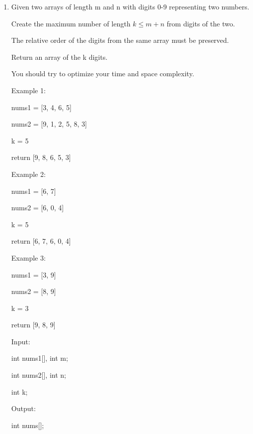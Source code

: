 \documentclass[12pt,a4paper]{article}
\begin{document}
\begin{enumerate}

~\\
~\\
~\\
~\\

\item Given two arrays of length m and n with digits 0-9 representing two numbers.

Create the maximum number of length $ k \leq m + n $ from digits of the two.

The relative order of the digits from the same array must be preserved.

Return an array of the k digits.

You should try to optimize your time and space complexity.

Example 1:

nums1 = [3, 4, 6, 5]

nums2 = [9, 1, 2, 5, 8, 3]

k = 5

return [9, 8, 6, 5, 3]

Example 2:

nums1 = [6, 7]

nums2 = [6, 0, 4]

k = 5

return [6, 7, 6, 0, 4]

Example 3:

nums1 = [3, 9]

nums2 = [8, 9]

k = 3

return [9, 8, 9]

Input:

int nums1[], int m;

int nums2[], int n;

int k;

Output:

int nums[];


~\\
~\\


\end{enumerate}
\end{document}
